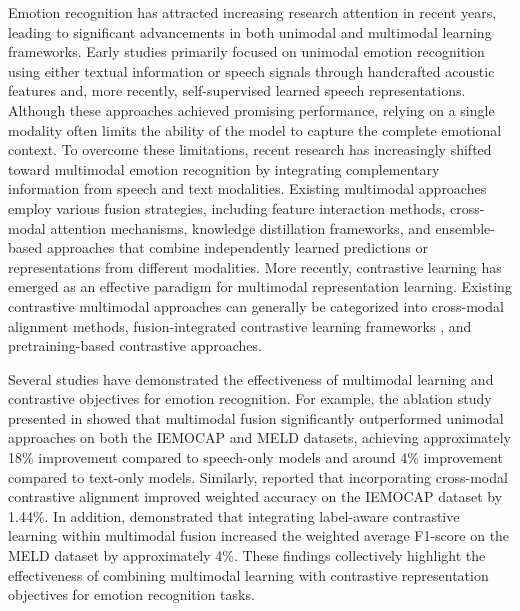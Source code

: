 Emotion recognition has attracted increasing research attention in recent years, leading to significant advancements in both unimodal and multimodal learning frameworks. Early studies primarily focused on unimodal emotion recognition using either textual information\cite{Cortiz2022, Batbaatar2019, Han2023} or speech signals through handcrafted acoustic features\cite{Mustaqeem2020, Venkataramanan2019, Novais2023} and, more recently, self-supervised learned speech representations\cite{Atmaja2022, Yingzhi2021}. Although these approaches achieved promising performance, relying on a single modality often limits the ability of the model to capture the complete emotional context. To overcome these limitations, recent research has increasingly shifted toward multimodal emotion recognition by integrating complementary information from speech and text modalities. Existing multimodal approaches employ various fusion strategies, including feature interaction methods\cite{Koudounas2026, Chen2020, Chudasama2022, Dikbiyik2025, ISLAM2026, Kakuba2023}, cross-modal attention mechanisms\cite{Krishna2020}, knowledge distillation frameworks\cite{KIM2026}, and ensemble-based approaches that combine independently learned predictions or representations from different modalities\cite{PAYALA2026, Sebastian2019}. More recently, contrastive learning has emerged as an effective paradigm for multimodal representation learning. Existing contrastive multimodal approaches can generally be categorized into cross-modal alignment methods\cite{qian2022}, fusion-integrated contrastive learning frameworks \cite{Shi2024, Li2025, Kim2023}, and pretraining-based contrastive approaches\cite{Jing2026, Nguyen2024}.

Several studies have demonstrated the effectiveness of multimodal learning and contrastive objectives for emotion recognition. For example, the ablation study presented in\cite{Shi2024} showed that multimodal fusion significantly outperformed unimodal approaches on both the IEMOCAP and MELD datasets, achieving approximately 18\% improvement compared to speech-only models and around 4\% improvement compared to text-only models. Similarly, \cite{qian2022} reported that incorporating cross-modal contrastive alignment improved weighted accuracy on the IEMOCAP dataset by 1.44\%. In addition,\cite{Li2025} demonstrated that integrating label-aware contrastive learning within multimodal fusion increased the weighted average F1-score on the MELD dataset by approximately 4\%. These findings collectively highlight the effectiveness of combining multimodal learning with contrastive representation objectives for emotion recognition tasks.

